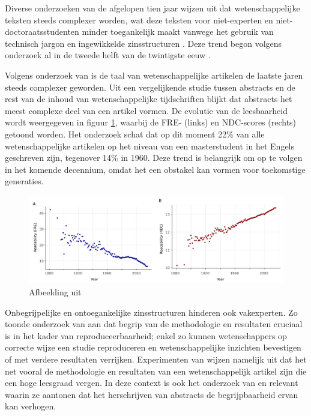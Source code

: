 \medspace

Diverse onderzoeken van de afgelopen tien jaar wijzen uit dat wetenschappelijke teksten steeds complexer worden, wat deze teksten voor niet-experten en niet-doctoraatsstudenten minder toegankelijk maakt vanwege het gebruik van technisch jargon en ingewikkelde zinsstructuren \autocite{Ball2017, PlavenSigray2017, Jones2019}. Deze trend begon volgens onderzoek al in de tweede helft van de twintigste eeuw \autocite{Hayes1992}.

\medspace

Volgens onderzoek van \textcite{PlavenSigray2017} is de taal van wetenschappelijke artikelen de laatste jaren steeds complexer geworden. Uit een vergelijkende studie tussen abstracts en de rest van de inhoud van wetenschappelijke tijdschriften blijkt dat abstracts het meest complexe deel van een artikel vormen. De evolutie van de leesbaarheid wordt weergegeven in figuur \ref{img:fre-ndc}, waarbij de FRE- (links) en NDC-scores (rechts) getoond worden. Het onderzoek schat dat op dit moment 22\% van alle wetenschappelijke artikelen op het niveau van een masterstudent in het Engels geschreven zijn, tegenover 14\% in 1960. Deze trend is belangrijk om op te volgen in het komende decennium, omdat het een obstakel kan vormen voor toekomstige generaties.

\begin{figure}[H]
	\includegraphics[width=\linewidth]{img/fre-ndc.png}
	\caption{Afbeelding uit \textcite{PlavenSigray2017}}
	\label{img:fre-ndc}
\end{figure}

\medspace

Onbegrijpelijke en ontoegankelijke zinsstructuren hinderen ook vakexperten. Zo toonde onderzoek van \textcite{McNutt2014} aan dat begrip van de methodologie en resultaten cruciaal is in het kader van reproduceerbaarheid; enkel zo kunnen wetenschappers op correcte wijze een studie reproduceren en wetenschappelijke inzichten bevestigen of met verdere resultaten verrijken. Experimenten van \textcite{Hubbard2017} wijzen namelijk uit dat het net vooral de methodologie en resultaten van een wetenschappelijk artikel zijn die een hoge leesgraad vergen. In deze context is ook het onderzoek van \textcite{Hartley1999} en \textcite{Snow2010} relevant waarin ze aantonen dat het herschrijven van abstracts de begrijpbaarheid ervan kan verhogen.

